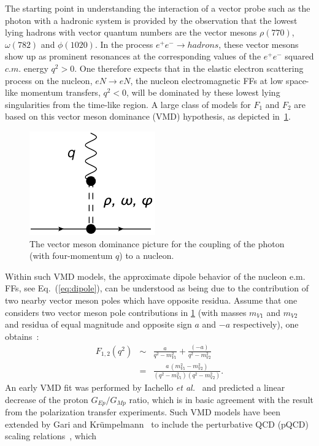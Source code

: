 The starting point in understanding the interaction of a vector probe 
such as the photon with a hadronic system is provided by the observation 
that the lowest lying hadrons with vector quantum numbers 
are the vector mesons $\rho(770)$, $\omega(782)$ and $\phi(1020)$. 
In the process $e^+ e^- \to hadrons$, these vector mesons show up as 
prominent resonances at the corresponding values of the $e^+ e^-$  
squared $c.m.$ energy $q^2 > 0$. 
One therefore expects that in the elastic electron scattering process 
on the nucleon, $e N \to e N$, the nucleon electromagnetic FFs 
at low space-like momentum transfers, $q^2 < 0$, will be dominated by these 
lowest lying singularities from the time-like region. 
A large class of models for $F_1$ and $F_2$ are based on this vector 
meson dominance (VMD) hypothesis, as depicted in~\ref{vmd}.
%
\begin{figure}[h]
\centerline{
\includegraphics[width = 3 cm]{ff_vmd.pdf}
}
\caption{\small The vector meson dominance picture for the coupling of the  
photon (with four-momentum $q$) to a nucleon. }
\label{vmd}
\end{figure}
%
\newline
\indent
Within such VMD models, the approximate dipole behavior of the nucleon 
e.m. FFs, see Eq.~(\ref{eq:dipole}), can be understood as being due to the 
contribution of two nearby vector meson poles which have opposite residua. 
Assume that one considers two vector meson pole contributions in \ref{vmd} 
(with masses $m_{V1}$ and $m_{V2}$ 
and residua of equal magnitude and opposite sign $a$ and $-a$ respectively), 
one obtains~:
\begin{eqnarray}
F_{1,2} (q^2) &\sim& \frac{a}{q^2 - m_{V1}^2} + \frac{(-a)}{q^2 - m_{V2}^2} 
			\nonumber\\
&=& \frac{a \, (m_{V1}^2 - m_{V2}^2)}{(q^2 - m_{V1}^2) (q^2 - m_{V2}^2)}.
\end{eqnarray}
\indent
An early VMD fit was performed by Iachello {\it et al.}~\cite{iach} and  
predicted a linear decrease of the proton $G_{Ep} / G_{Mp}$ ratio, which 
is in basic agreement with the result from the polarization transfer 
experiments. Such VMD models have been extended by Gari and 
Kr\"umpelmann~\cite{gari} to include the perturbative QCD (pQCD) 
scaling relations~\cite{brodlep}, which 
